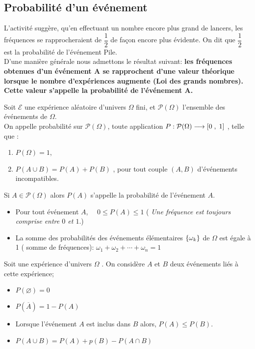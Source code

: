 \subsection*{Probabilité d'un événement}
L'activité suggère, qu'en effectuant un nombre encore plus grand de lancers, les fréquences se
rapprocheraient de \;$\dfrac{1}{2} $ \; de façon encore plus évidente. On dit que \; $\dfrac{1}{2} $ \; est la probabilité de l'événement Pile. \\
D'une manière générale  nous admettons le  résultat suivant: \textbf{les fréquences obtenues d’un événement A se rapprochent d’une valeur théorique lorsque le nombre d’expériences augmente (Loi des grands nombres). Cette valeur s’appelle la probabilité de l’événement A.}
\begin{definition}
Soit $ \mathcal{E} $ une expérience aléatoire d’univers $ \Omega $ fini,  et  $ \mathcal{P}(\Omega) $ l’ensemble des événements  de $ \Omega $.\\ On appelle probabilité sur $ \mathcal{P}(\Omega) $, toute application  $ P : \mathcal{P}(\Omega) \longrightarrow  \left[0\;,\; 1\right] $ , telle que :
\begin{enumerate}
\item $  P(\Omega)=1 $,
\item $ P(A\cup B)=P(A)+ P(B) $ , pour tout couple $(A, B)$  d’événements incompatibles.
\end{enumerate}
 

Si $ A\in  \mathcal{P}(\Omega) $  alors  $ P(A) $ s'appelle la probabilité de l'événement $ A. $
\end{definition}
\begin{remark}
\begin{itemize}
\item Pour tout événement  $ A $, $\quad 0\leq  P(A) \leq 1 $\; ( \textit{Une fréquence est toujours comprise entre \; $0 $ et $ 1.$})
\item La somme des probabilités  des événements élémentaires $ \left\{\omega_{k}\right\} $ de $ \Omega $  est égale à 1   ( somme  de fréquences): $ \omega _{1} +\omega _{2}+\cdots + \omega_{n} =1 $
\end{itemize}
\end{remark}
\begin{property} 
Soit une expérience d’univers $ \Omega $ . On considère  $A$ et $ B$ deux événements liés à cette expérience;
\begin{itemize}
\item $ P(\varnothing)=0 $
\item $ P(\overline{A} )=1-P(A)$
\item Lorsque l’événement  $A$ est inclus dans $B$ alors,  $P(A) \leq P(B)$.
\item $ P(A\cup B)= P(A)+ p(B)- P(A \cap B) $
\end{itemize}
\end{property}
